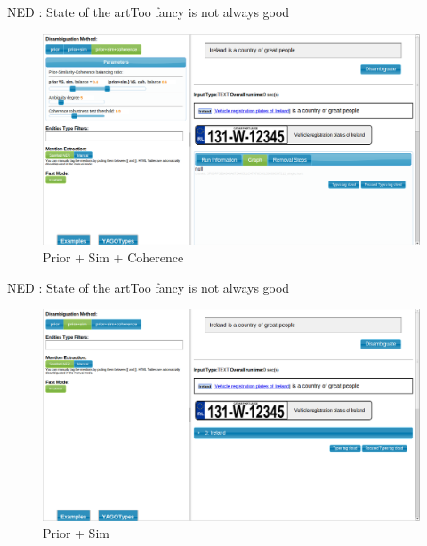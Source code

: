 \begin{frame}{NED : State of the art}{Too fancy is not always good}
\begin{figure}[h]
 \centering
 \includegraphics[bb=0 0 1366 768,scale=0.23]{./prior1.png}
 \caption{Prior + Sim + Coherence}
\end{figure}
\end{frame}
\begin{frame}{NED : State of the art}{Too fancy is not always good}
\begin{figure}[h]
 \centering
 \includegraphics[bb=0 0 1366 768,scale=0.23]{./prior2.png}
 \caption{Prior + Sim}
\end{figure}
\end{frame}

